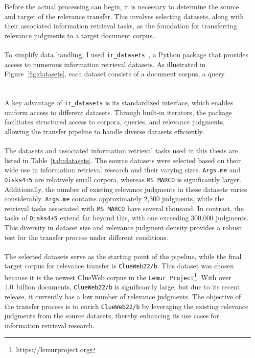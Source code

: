 Before the actual processing can begin, it is necessary to determine the source and target of the relevance transfer. This involves selecting datasets, along with their associated information retrieval tasks, as the foundation for transferring relevance judgments to a target document corpus.
\\\\
To simplify data handling, I used \texttt{ir\_datasets}~\citep{macavaney:2021}, a Python package that provides access to numerous information retrieval datasets. As illustrated in Figure~\ref{fig:datasets}, each dataset consists of a document corpus, a query 
\\\\\\
A key advantage of \texttt{ir\_datasets} is its standardized interface, which enables uniform access to different datasets. Through built-in iterators, the package facilitates structured access to corpora, queries, and relevance judgments, allowing the transfer pipeline to handle diverse datasets efficiently.
\\\\
The datasets and associated information retrieval tasks used in this thesis are listed in Table~\ref{tab:datasets}. The source datasets were selected based on their wide use in information retrieval research and their varying sizes. \texttt{Args.me} and \texttt{Disks4+5} are relatively small corpora, whereas \texttt{MS MARCO} is significantly larger. Additionally, the number of existing relevance judgments in these datasets varies considerably. \texttt{Args.me} contains approximately 2,300 judgments, while the retrieval tasks associated with \texttt{MS MARCO} have several thousand. In contrast, the tasks of \texttt{Disks4+5} extend far beyond this, with one exceeding 300,000 judgments. This diversity in dataset size and relevance judgment density provides a robust test for the transfer process under different conditions.
\\\\
The selected datasets serve as the starting point of the pipeline, while the final target corpus for relevance transfer is \texttt{ClueWeb22/b}. This dataset was chosen because it is the newest ClueWeb corpus in the \texttt{Lemur Project}\footnote{https://lemurproject.org}. With over 1.0~billion documents, \texttt{ClueWeb22/b} is significantly large, but due to its recent release, it currently has a low number of relevance judgments. The objective of the transfer process is to enrich \texttt{ClueWeb22/b} by leveraging the existing relevance judgments from the source datasets, thereby enhancing its use cases for information retrieval research.
\pagebreak


